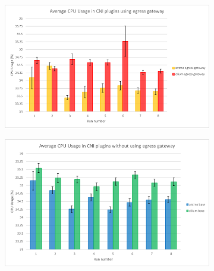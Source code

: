 \begin{figure}[H]
    \centering
    \begin{subfigure}[b]{0.35\textwidth}
        \includegraphics[width=\textwidth]{plots/small/cpu_egress.png}
        \caption{}
        \label{fig:cpu_a}
    \end{subfigure}
    \hfill
    \begin{subfigure}[b]{0.35\textwidth}
        \includegraphics[width=\textwidth]{plots/small/cpu_base.png}
        \caption{}
        \label{fig:cpu_b}
    \end{subfigure}
    
    \vspace{10pt}
    

\end{figure}
